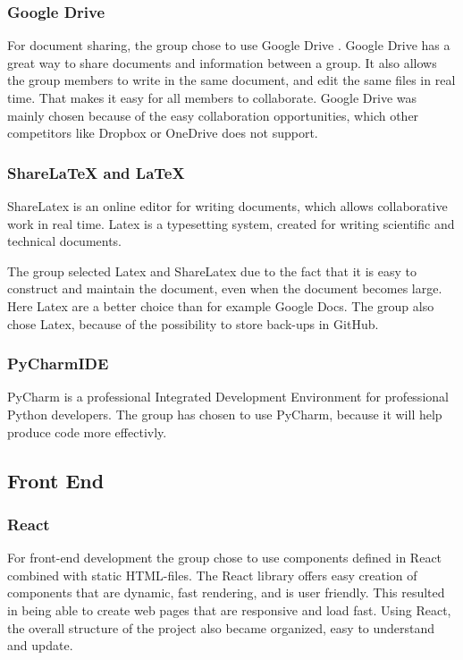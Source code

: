 \subsubsection{Google Drive}
For document sharing, the group chose to use Google Drive \cite{GoogleDrive}. Google Drive has a great way to share documents and information between a group. It also allows the group members to write in the same document, and edit the same files in real time. That makes it easy for all members to collaborate. Google Drive was mainly chosen because of the easy collaboration opportunities, which other competitors like Dropbox or OneDrive does not support. 

\subsubsection{ShareLaTeX and LaTeX}
ShareLatex \cite{ShareLatex} is an online editor for writing documents, which allows collaborative work in real time. Latex is a typesetting system, created for writing scientific and technical documents.

The group selected Latex and ShareLatex due to the fact that it is easy to construct and maintain the document, even when the document becomes large. Here Latex are a better choice than for example Google Docs. The group also chose Latex, because of the possibility to store back-ups in GitHub.

\subsubsection{PyCharmIDE}
PyCharm is a professional Integrated Development Environment for professional Python developers. The group has chosen to use PyCharm, because it will help produce code more effectivly. 

\subsection{Front End}
\subsubsection{React}
For front-end development the group chose to use components defined in React \cite{React} combined with static HTML-files. The React library offers easy creation of components that are dynamic, fast rendering, and is user friendly. This resulted in being able to create web pages that are responsive and load fast. Using React, the overall structure of the project also became organized, easy to understand and update.

